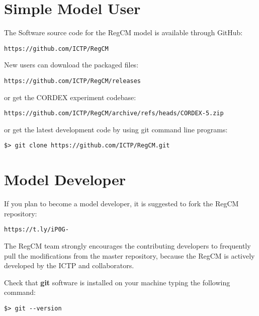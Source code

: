 
\section{Simple Model User}

The Software source code for the RegCM model is available through GitHub:

\begin{Verbatim}
https://github.com/ICTP/RegCM
\end{Verbatim}

New users can download the packaged files:

\begin{Verbatim}
https://github.com/ICTP/RegCM/releases
\end{Verbatim}

or get the CORDEX experiment codebase:

\begin{Verbatim}
https://github.com/ICTP/RegCM/archive/refs/heads/CORDEX-5.zip
\end{Verbatim}

or get the latest development code by using git command line programs:

\begin{Verbatim}
$> git clone https://github.com/ICTP/RegCM.git
\end{Verbatim}


\section{Model Developer}

If you plan to become a model developer, it is suggested to fork the RegCM
repository:

\begin{Verbatim}
https://t.ly/iP0G-
\end{Verbatim}

The RegCM team strongly encourages the contributing developers to frequently
pull the modifications from the master repository, because the RegCM is
actively developed by the ICTP and collaborators.

Check that {\bf git} software is installed on your machine typing
the following command:

\begin{verbatim}
$> git --version
\end{verbatim}
